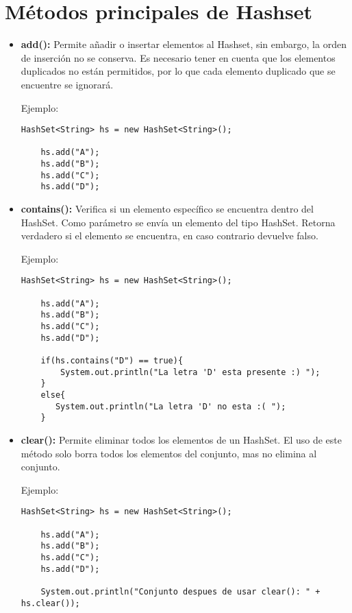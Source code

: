 \documentclass[12pt, letterpaper]{article} %
\begin{document}
\section*{Métodos principales de Hashset}
\begin{itemize}
    \item \textbf{add():} Permite añadir o insertar elementos al Hashset, sin embargo, la orden de inserción no se conserva. Es necesario tener en cuenta que los elementos duplicados no están permitidos, por lo que cada elemento duplicado que se encuentre se ignorará.

    Ejemplo:
    \lstset{language = Java, breaklines=true, basicstyle=\footnotesize}
    \begin{lstlisting}[frame=single]
    HashSet<String> hs = new HashSet<String>();

    hs.add("A");
    hs.add("B");
    hs.add("C");
    hs.add("D");
    \end{lstlisting}

    \item \textbf{contains():} Verifica si un elemento específico se encuentra dentro del HashSet. Como parámetro se envía un elemento del tipo HashSet. Retorna  verdadero si el elemento se encuentra, en caso contrario devuelve falso.

    Ejemplo:
    \lstset{language = Java, breaklines=true, basicstyle=\footnotesize}
    \begin{lstlisting}[frame=single]
    HashSet<String> hs = new HashSet<String>();

    hs.add("A");
    hs.add("B");
    hs.add("C");
    hs.add("D");

    if(hs.contains("D") == true){
        System.out.println("La letra 'D' esta presente :) ");
    }
    else{
	   System.out.println("La letra 'D' no esta :( ");
    }
    \end{lstlisting}

    \item \textbf{clear():} Permite eliminar todos los elementos de un HashSet. El uso de este método solo borra todos los elementos del conjunto, mas no elimina al conjunto.

    Ejemplo:
    \lstset{language = Java, breaklines=true, basicstyle=\footnotesize}
    \begin{lstlisting}[frame=single]
    HashSet<String> hs = new HashSet<String>();

    hs.add("A");
    hs.add("B");
    hs.add("C");
    hs.add("D");

    System.out.println("Conjunto despues de usar clear(): " + hs.clear());
    \end{lstlisting}


\end{itemize}
\end{document}
